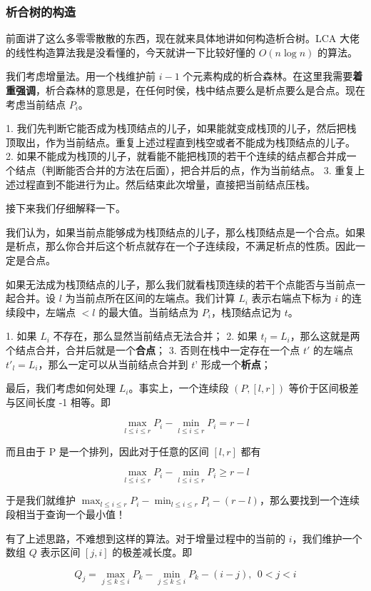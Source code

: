 \documentclass[12pt]{ctexart}
\begin{document}
\subsubsection{析合树的构造}

前面讲了这么多零零散散的东西，现在就来具体地讲如何构造析合树。LCA 大佬的线性构造算法我是没看懂的，今天就讲一下比较好懂的 $O(n\log n)$ 的算法。

我们考虑增量法。用一个栈维护前 $i-1$ 个元素构成的析合森林。在这里我需要\textbf{着重强调}，析合森林的意思是，在任何时侯，栈中结点要么是析点要么是合点。现在考虑当前结点 $P_i$。

1. 我们先判断它能否成为栈顶结点的儿子，如果能就变成栈顶的儿子，然后把栈顶取出，作为当前结点。重复上述过程直到栈空或者不能成为栈顶结点的儿子。
2. 如果不能成为栈顶的儿子，就看能不能把栈顶的若干个连续的结点都合并成一个结点（判断能否合并的方法在后面），把合并后的点，作为当前结点。
3. 重复上述过程直到不能进行为止。然后结束此次增量，直接把当前结点压栈。

接下来我们仔细解释一下。

我们认为，如果当前点能够成为栈顶结点的儿子，那么栈顶结点是一个合点。如果是析点，那么你合并后这个析点就存在一个子连续段，不满足析点的性质。因此一定是合点。

如果无法成为栈顶结点的儿子，那么我们就看栈顶连续的若干个点能否与当前点一起合并。设 $l$ 为当前点所在区间的左端点。我们计算 $L_i$ 表示右端点下标为 $i$ 的连续段中，左端点 $< l$ 的最大值。当前结点为 $P_i$，栈顶结点记为 $t$。

1. 如果 $L_i$ 不存在，那么显然当前结点无法合并；
2. 如果 $t_l=L_i$，那么这就是两个结点合并，合并后就是一个\textbf{合点}；
3. 否则在栈中一定存在一个点 $t'$ 的左端点 ${t'}_l=L_i$，那么一定可以从当前结点合并到 $t’$ 形成一个\textbf{析点}；

最后，我们考虑如何处理 $L_i$。事实上，一个连续段 $(P,[l,r])$ 等价于区间极差与区间长度 -1 相等。即

$$
\max_{l\le i\le r}P_i-\min_{l\le i\le r}P_i=r-l
$$

而且由于 P 是一个排列，因此对于任意的区间 $[l,r]$ 都有

$$
\max_{l\le i\le r}P_i-\min_{l\le i\le r}P_i\ge r-l
$$

于是我们就维护 $\max_{l\le i\le r}P_i-\min_{l\le i\le r}P_i-(r-l)$，那么要找到一个连续段相当于查询一个最小值！

有了上述思路，不难想到这样的算法。对于增量过程中的当前的 $i$，我们维护一个数组 $Q$ 表示区间 $[j,i]$ 的极差减长度。即

$$
Q_j=\max_{j\le k\le i}P_k-\min_{j\le k\le i}P_k-(i-j),\ \ 0<j<i
$$
\end{document}
